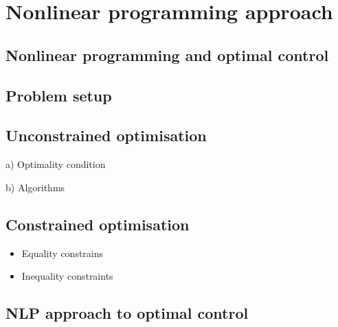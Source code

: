 \section{Nonlinear programming approach}
\subsection{Nonlinear programming and optimal control}
\subsection{Problem setup}
\subsection{Unconstrained optimisation}
a) Optimality condition\\

    
b) Algorithms

\subsection{Constrained optimisation}

\begin{itemize}
    \item Equality constrains
    \item Inequality constraints
\end{itemize}

\subsection{NLP approach to optimal control}
\cleardoublepage
